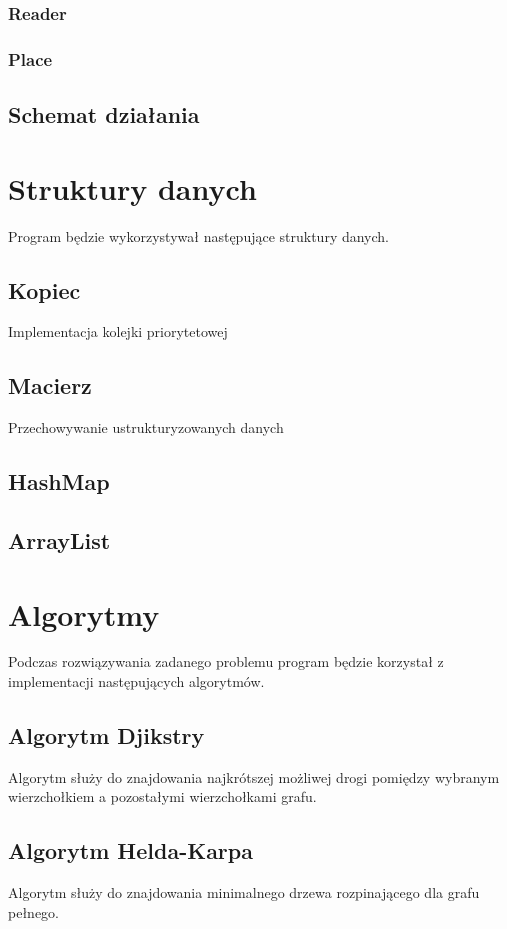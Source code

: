 \documentclass{article}
\begin{document}
\subsubsection{Reader}

\subsubsection{Place}

\subsection{Schemat działania}

\section{Struktury danych}
Program będzie wykorzystywał następujące struktury danych.

\subsection{Kopiec}
    Implementacja kolejki priorytetowej
    
\subsection{Macierz}
    Przechowywanie ustrukturyzowanych danych
    
\subsection{HashMap}

\subsection{ArrayList}

\section{Algorytmy}
Podczas rozwiązywania zadanego problemu program będzie korzystał z implementacji następujących algorytmów.

\subsection{Algorytm Djikstry}
Algorytm służy do znajdowania najkrótszej możliwej drogi pomiędzy wybranym wierzchołkiem a pozostałymi wierzchołkami grafu. 

\subsection{Algorytm Helda-Karpa}
Algorytm służy do znajdowania minimalnego drzewa rozpinającego dla grafu pełnego. 
\end{document}
